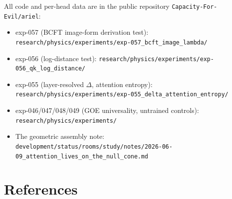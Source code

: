 All code and per-head data are in the public repository
\texttt{Capacity-For-Evil/ariel}:

\begin{itemize}
\tightlist
\item
  exp-057 (BCFT image-form derivation test):
  \texttt{research/physics/experiments/exp-057\_bcft\_image\_lambda/}
\item
  exp-056 (log-distance test):
  \texttt{research/physics/experiments/exp-056\_qk\_log\_distance/}
\item
  exp-055 (layer-resolved \(\Delta\), attention entropy):
  \texttt{research/physics/experiments/exp-055\_delta\_attention\_entropy/}
\item
  exp-046/047/048/049 (GOE universality, untrained controls):
  \texttt{research/physics/experiments/}
\item
  The geometric assembly note:
  \texttt{development/status/rooms/study/notes/2026-06-09\_attention\_lives\_on\_the\_null\_cone.md}
\end{itemize}

\section*{References}\label{references}

